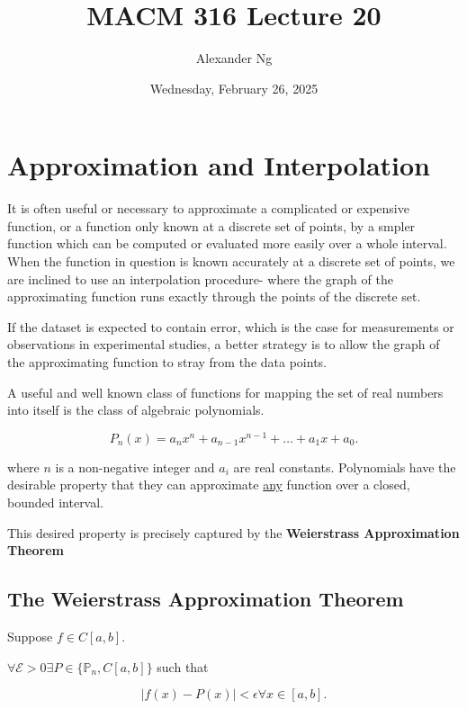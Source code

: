 \documentclass[12pt]{article}
\newcommand{\bigEps}{\mathcal{E}}
\begin{document}
\title{MACM 316 Lecture 20}
\author{Alexander Ng}
\date{Wednesday, February 26, 2025}

\maketitle

\section{Approximation and Interpolation}

It is often useful or necessary to approximate a complicated or expensive function,
or a function only known at a discrete set of points, by a smpler function
which can be computed or evaluated more easily over a whole interval. When the
function in question is known accurately at a discrete set of points, we are
inclined to use an interpolation procedure- where the graph of the approximating 
function runs exactly through the points of the discrete set. 

If the dataset is expected to contain error, which is the case for measurements
or observations in experimental studies, a better strategy is to allow the
graph of the approximating function to stray from the data points.


A useful and well known class of functions for mapping the set of real numbers
into itself is the class of algebraic polynomials.

\[
  P_n(x) = a_nx^n + a_{n-1}x^{n-1} + \dots + a_1x + a_0
.\]

where $n$ is a non-negative integer and $a_i$ are real constants. Polynomials 
have the desirable property that they can approximate \uline{any} function
over a closed, bounded interval.

This desired property is precisely captured by the \textbf{Weierstrass 
Approximation Theorem}

\pagebreak

\subsection{The Weierstrass Approximation Theorem}

Suppose $f \in C[a,b]$. 

$\forall \bigEps > 0 \exists P \in \{ \mathbb{P}_n , C[a,b] \}$ such that

\[
  |f(x)-P(x)| < \epsilon \forall x \in [a,b]
.\]
\end{document}
